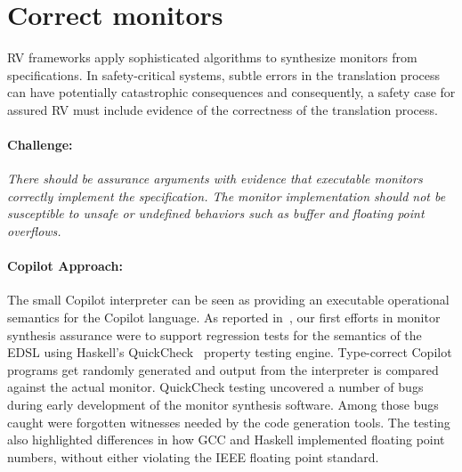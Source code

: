 \section{Correct monitors} \label{sec:codecorrect} 
 RV frameworks apply sophisticated algorithms to synthesize  monitors
 from specifications. In safety-critical systems, subtle errors in the
 translation process can have potentially catastrophic
 consequences and consequently, a safety case for assured RV must
 include  evidence of the correctness of the translation process.



\paragraph{Challenge:} \emph{There should be assurance arguments with
  evidence that
executable monitors correctly implement the specification.  The monitor implementation
should not be susceptible to unsafe or undefined behaviors such as
buffer and floating point overflows.}

\paragraph{Copilot Approach:}    
The  small  Copilot interpreter can be seen as providing an executable
operational semantics for the Copilot language.  As reported
in~\cite{pike-icfp-12}, our first efforts in monitor
synthesis assurance were  to support  regression tests for the semantics
of the EDSL using Haskell's QuickCheck~\cite{qc} property testing
engine. Type-correct Copilot programs get randomly generated and
output from the interpreter is compared against the actual
monitor. QuickCheck testing uncovered 
a number of bugs during early development of the monitor synthesis
software. Among those bugs caught were forgotten witnesses needed by
the code generation tools. The testing also highlighted 
differences in how GCC and Haskell implemented floating point numbers,
without either violating the IEEE floating point standard. 



